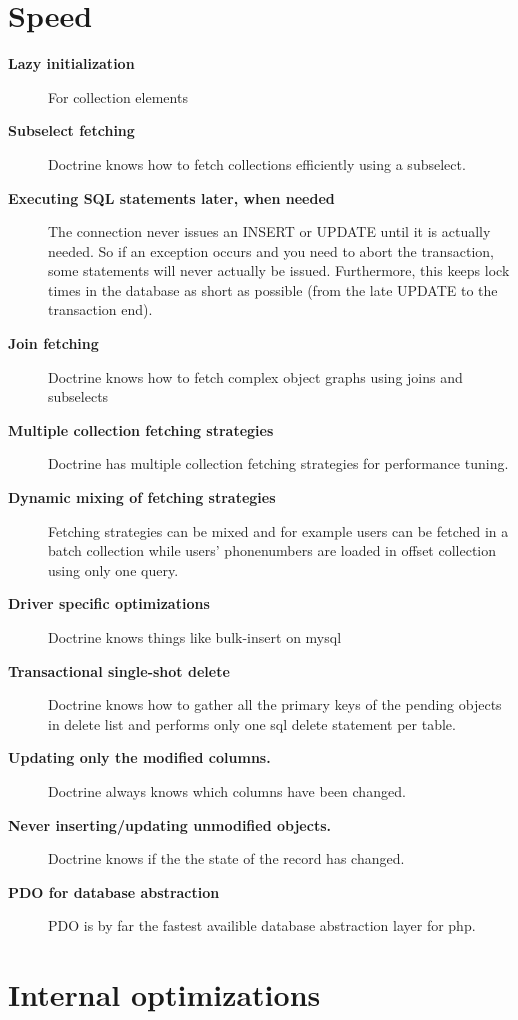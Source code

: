 \documentclass[11pt,a4paper]{report}
\begin{document}
\section{Speed}
\begin{description}
\item[\textbf{Lazy initialization}] {For collection elements}
\item[\textbf{Subselect fetching}] {Doctrine knows how to fetch collections efficiently using a subselect.}
\item[\textbf{Executing SQL statements later, when needed}] {The connection never issues an INSERT or UPDATE until it is actually needed. So if an exception occurs and you need to abort the transaction, some statements will never actually be issued. Furthermore, this keeps lock times in the database as short as possible (from the late UPDATE to the transaction end).}
\item[\textbf{Join fetching}] {Doctrine knows how to fetch complex object graphs using joins and subselects}
\item[\textbf{Multiple collection fetching strategies}] {Doctrine has multiple collection fetching strategies for performance tuning.}
\item[\textbf{Dynamic mixing of fetching strategies}] {Fetching strategies can be mixed and for example users can be fetched in a batch collection while users' phonenumbers are loaded in offset collection using only one query.}
\item[\textbf{Driver specific optimizations}] {Doctrine knows things like bulk-insert on mysql}
\item[\textbf{Transactional single-shot delete}] {Doctrine knows how to gather all the primary keys of the pending objects in delete list and performs only one sql delete statement per table.}
\item[\textbf{Updating only the modified columns.}] {Doctrine always knows which columns have been changed.}
\item[\textbf{Never inserting/updating unmodified objects.}] {Doctrine knows if the the state of the record has changed.}
\item[\textbf{PDO for database abstraction}] {PDO is by far the fastest availible database abstraction layer for php.}
\end{description}

\section{Internal optimizations}
\end{document}
